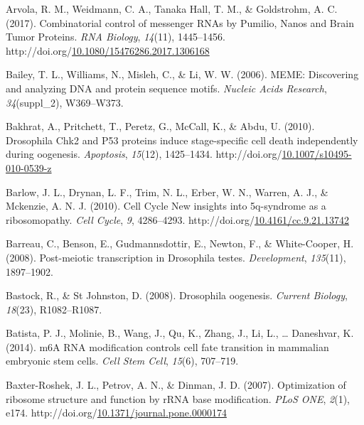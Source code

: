 \documentclass[12pt,oneside]{reedthesis}
\newlength{\cslhangindent}
\newenvironment{CSLReferences}[2] %
 {%
  \setlength{\parindent}{0pt}
  \ifodd #1 \everypar{\setlength{\hangindent}{\cslhangindent}}\ignorespaces\fi
  \ifnum #2 > 0
  \setlength{\parskip}{#2\baselineskip}
  \fi
 }%
 {}
\begin{document}
\begin{CSLReferences}{1}{0}
\leavevmode{}%
Arvola, R. M., Weidmann, C. A., Tanaka Hall, T. M., \& Goldstrohm, A. C. (2017). Combinatorial control of messenger {RNAs} by {Pumilio}, {Nanos} and {Brain Tumor Proteins}. \emph{RNA Biology}, \emph{14}(11), 1445--1456. http://doi.org/\href{https://doi.org/10.1080/15476286.2017.1306168}{10.1080/15476286.2017.1306168}

\leavevmode{}%
Bailey, T. L., Williams, N., Misleh, C., \& Li, W. W. (2006). {MEME}: Discovering and analyzing {DNA} and protein sequence motifs. \emph{Nucleic Acids Research}, \emph{34}(suppl\_2), W369--W373.

\leavevmode{}%
Bakhrat, A., Pritchett, T., Peretz, G., McCall, K., \& Abdu, U. (2010). Drosophila {Chk2} and P53 proteins induce stage-specific cell death independently during oogenesis. \emph{Apoptosis}, \emph{15}(12), 1425--1434. http://doi.org/\href{https://doi.org/10.1007/s10495-010-0539-z}{10.1007/s10495-010-0539-z}

\leavevmode{}%
Barlow, J. L., Drynan, L. F., Trim, N. L., Erber, W. N., Warren, A. J., \& Mckenzie, A. N. J. (2010). Cell {Cycle New} insights into 5q-syndrome as a ribosomopathy. \emph{Cell Cycle}, \emph{9}, 4286--4293. http://doi.org/\href{https://doi.org/10.4161/cc.9.21.13742}{10.4161/cc.9.21.13742}

\leavevmode{}%
Barreau, C., Benson, E., Gudmannsdottir, E., Newton, F., \& White-Cooper, H. (2008). Post-meiotic transcription in {Drosophila} testes. \emph{Development}, \emph{135}(11), 1897--1902.

\leavevmode{}%
Bastock, R., \& St Johnston, D. (2008). Drosophila oogenesis. \emph{Current Biology}, \emph{18}(23), R1082--R1087.

\leavevmode{}%
Batista, P. J., Molinie, B., Wang, J., Qu, K., Zhang, J., Li, L., \ldots{} Daneshvar, K. (2014). {m6A RNA} modification controls cell fate transition in mammalian embryonic stem cells. \emph{Cell Stem Cell}, \emph{15}(6), 707--719.

\leavevmode{}%
Baxter-Roshek, J. L., Petrov, A. N., \& Dinman, J. D. (2007). Optimization of ribosome structure and function by {rRNA} base modification. \emph{PLoS ONE}, \emph{2}(1), e174. http://doi.org/\href{https://doi.org/10.1371/journal.pone.0000174}{10.1371/journal.pone.0000174}


\end{CSLReferences}
\end{document}
